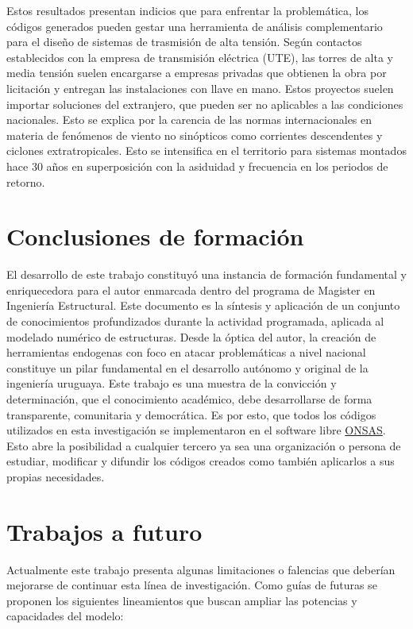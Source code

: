 Estos resultados presentan indicios que para enfrentar la problemática, los códigos generados pueden gestar una herramienta de análisis complementario para el diseño de sistemas de trasmisión de alta tensión. Según contactos establecidos con la empresa de transmisión eléctrica (UTE), las torres de alta y media tensión suelen encargarse a empresas privadas que obtienen la obra por licitación y entregan las instalaciones con llave en mano. Estos proyectos suelen importar soluciones del extranjero, que pueden ser no aplicables a las condiciones nacionales. Esto se explica por la carencia de las normas internacionales en materia de fenómenos de viento no sinópticos como corrientes descendentes y ciclones extratropicales. Esto se intensifica en el territorio para sistemas montados hace 30 años en superposición con la asiduidad y frecuencia en los periodos de retorno. 

\section{Conclusiones de formación}
El desarrollo de este trabajo constituyó una instancia de formación fundamental y enriquecedora para el autor enmarcada dentro del programa de Magister en Ingeniería Estructural. Este documento es la síntesis y aplicación de un conjunto de conocimientos profundizados durante la actividad programada, aplicada al modelado numérico de estructuras. Desde la óptica del autor, la creación de herramientas endogenas con foco en atacar problemáticas a nivel nacional constituye un pilar fundamental en el desarrollo autónomo y original de la ingeniería uruguaya. Este trabajo es una muestra de la convicción y determinación, que el conocimiento académico, debe desarrollarse de forma transparente, comunitaria y democrática. Es por esto, que todos los códigos utilizados en esta investigación se implementaron en el software libre \href{https://github.com/ONSAS/ONSAS/}{ONSAS}. Esto abre la posibilidad a cualquier tercero ya sea una organización o persona de estudiar, modificar y difundir los códigos creados como también aplicarlos a sus propias necesidades. 

\section{Trabajos a futuro}

Actualmente este trabajo presenta algunas limitaciones o falencias que deberían mejorarse de continuar esta línea de investigación. Como guías de futuras se proponen los siguientes lineamientos que buscan ampliar las potencias y capacidades del modelo:

